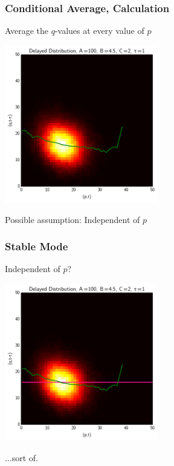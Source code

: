 \documentclass[xcolor={usenames,dvipsnames,svgnames}]{beamer}
\begin{document}
\begin{frame}
    \frametitle{Conditional Average, Calculation}

    Average the $q$-values at every value of $p$


    \begin{center}
        \includegraphics[width=0.5\textwidth]{../results/presentation/ddjd-ca-a100-c2-t1.png}
    \end{center}

    Possible assumption: Independent of $p$
\end{frame}

\begin{frame}
    \frametitle{Stable Mode}
    Independent of $p$?

    \begin{center}
        \includegraphics[width=0.5\textwidth]{../results/presentation/ddjd-ca-a100-c2-t1-flat.png}
    \end{center}

    ...sort of.

\end{frame}
\end{document}
